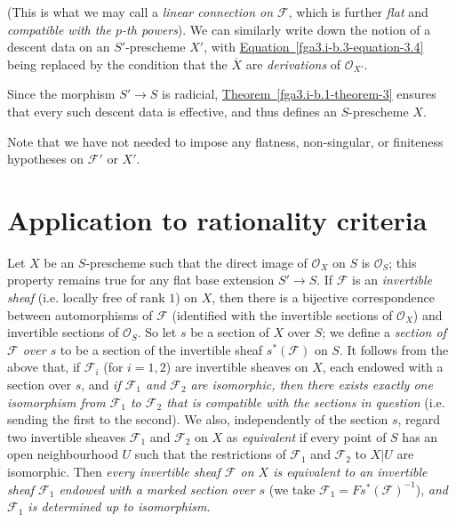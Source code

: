   (This is what we may call a \emph{linear connection on \(\mathcal {F}\)}, which is further \emph{flat} and \emph{compatible with the \(p\)-th powers}).
  We can similarly write down the notion of a descent data on an \(S'\)-prescheme \(X'\), with \hyperref[fga3.i-b.3-equation-3.4]{Equation~\ref*{fga3.i-b.3-equation-3.4}} being replaced by the condition that the \(\overline {X}\) are \emph{derivations} of \(\mathscr {O}_{X'}\).
  
  Since the morphism \(S'\to  S\) is radicial, \hyperref[fga3.i-b.1-theorem-3]{Theorem~\ref*{fga3.i-b.1-theorem-3}} ensures that every such descent data is effective, and thus defines an \(S\)-prescheme \(X\).\par{}Note that we have not needed to impose any flatness, non-singular, or finiteness hypotheses on \(\mathcal {F}'\) or \(X'\).\section{Application to rationality criteria}\label{fga3.i-b.4}\par{}Let \(X\) be an \(S\)-prescheme such that the direct image of \(\mathscr {O}_X\) on \(S\) is \(\mathscr {O}_S\);
  this property remains true for any flat base extension \(S'\to  S\).
  If \(\mathcal {F}\) is an \emph{invertible sheaf} (i.e. locally free of rank \(1\)) on \(X\), then there is a bijective correspondence between automorphisms of \(\mathcal {F}\) (identified with the invertible sections of \(\mathscr {O}_X\)) and invertible sections of \(\mathscr {O}_S\).
  So let \(s\) be a section of \(X\) over \(S\);
  we define a \emph{section of \(\mathcal {F}\) over \(s\)} to be a section of the invertible sheaf \(s^*(\mathcal {F})\) on \(S\).
  It follows from the above that, if \(\mathcal {F}_i\) (for \(i=1,2\)) are invertible sheaves on \(X\), each endowed with a section over \(s\), and \emph{if \(\mathcal {F}_1\) and \(\mathcal {F}_2\) are isomorphic, then there exists exactly one isomorphism from \(\mathcal {F}_1\) to \(\mathcal {F}_2\) that is compatible with the sections in question} (i.e. sending the first to the second).
  We also, independently of the section \(s\), regard two invertible sheaves \(\mathcal {F}_1\) and \(\mathcal {F}_2\) on \(X\) as \emph{equivalent} if every point of \(S\) has an open neighbourhood \(U\) such that the restrictions of \(\mathcal {F}_1\) and \(\mathcal {F}_2\) to \(X|U\) are isomorphic.
  Then \emph{every invertible sheaf \(\mathcal {F}\) on \(X\) is equivalent to an invertible sheaf \(\mathcal {F}_1\) endowed with a marked section over \(s\)} (we take \(\mathcal {F}_1=Fs^*(\mathcal {F})^{-1}\)), \emph{and \(\mathcal {F}_1\) is determined up to isomorphism}.
